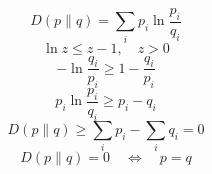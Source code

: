 \documentclass{article}
\begin{document}
\[
D(p\|q)=\sum_i p_i\ln\frac{p_i}{q_i}
\]
\[
\ln z\leq z-1,\quad z>0
\]
\[
-\ln\frac{q_i}{p_i}\geq1-\frac{q_i}{p_i}
\]
\[
p_i\ln\frac{p_i}{q_i}\geq p_i-q_i
\]
\[
D(p\|q)\geq\sum_i p_i-\sum_i q_i=0
\]
\[
D(p\|q)=0\quad\Longleftrightarrow\quad p=q
\]
\end{document}
